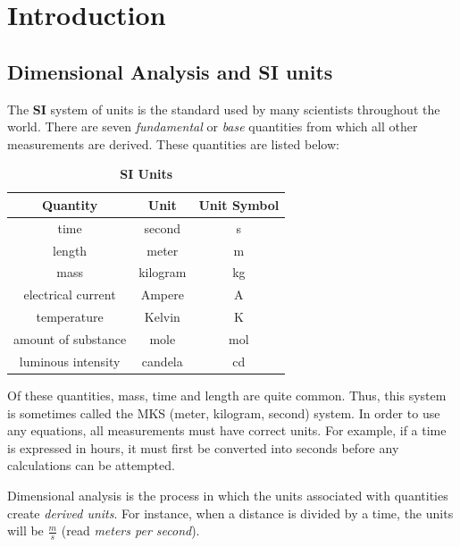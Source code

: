 \chapter{Introduction}
\section{Dimensional Analysis and SI units}
The \textbf{SI} system of units is the standard used by many scientists throughout the world.  There are seven \textit{fundamental} or \textit{base} quantities from which all other measurements are derived.  These quantities are listed below:

\begin{center}

	
\begin{table}[ht]\caption{\textbf{SI Units}}%
	\centering %
	\begin{tabular}{|c|c|c|}
		\hline \hline
		\textbf{Quantity} & \textbf{Unit} & \textbf{Unit Symbol}\\
		\hline
		time & second & s \\
		\hline
		length & meter & m \\
		\hline
		mass & kilogram & kg \\
		\hline
		electrical current & Ampere & A \\
		\hline
		temperature & Kelvin & K \\
		\hline
		amount of substance & mole & mol \\
		\hline
		luminous intensity & candela & cd \\
		\hline		
	\end{tabular}
	\label{table:nonlin}%
\end{table}
\end{center}

	Of these quantities, mass, time and length are quite common.  Thus, this system is sometimes called the MKS (meter, kilogram, second) system. In order to use any equations, all measurements must have correct units.  For example, if a time is expressed in hours, it must first be converted into seconds before any calculations can be attempted.  
	
	Dimensional analysis  is the process in which the units associated with quantities create \textit{derived units}.  For instance, when a distance is divided by a time, the units will be $ \frac{m}{s}$ (read \textit{meters per second}).  	
	
